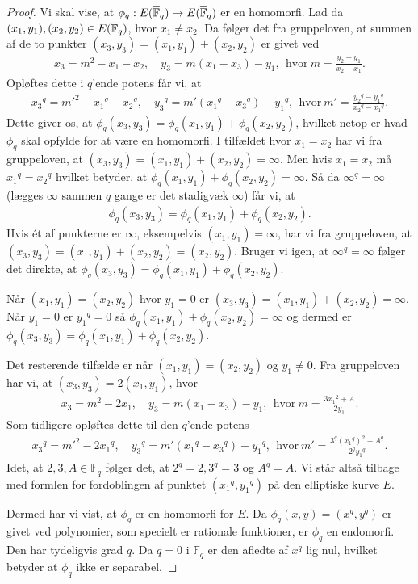 \begin{proof}
Vi skal vise, at $\phi_q : E(\overline{\mathbb{F}}_q) \to E(\overline{\mathbb{F}}_q)$ er en homomorfi. Lad da $(x_1, y_1), (x_2, y_2) \in E(\overline{\mathbb{F}}_q)$, hvor $x_1 \neq x_2$. Da følger det fra gruppeloven, at summen af de to punkter $(x_3, y_3) = (x_1, y_1) + (x_2, y_2)$ er givet ved
\begin{align*}
	x_3 = m^2 - x_1 - x_2, \quad y_3 = m(x_1 - x_3) - y_1, \ \ \text{hvor} \ m=\frac{y_2-y_1}{x_2-x_1}.
\end{align*}
Opløftes dette i $q$'ende potens får vi, at 
\begin{align*}
	{x_3}^q = {m'}^2 - {x_1}^q - {x_2}^q, \quad {y_3}^q = m'({x_1}^q - {x_3}^q) - {y_1}^q, \ \
	\text{hvor} \ m' = \frac{{y_2}^q - {y_1}^q}{{x_2}^q - {x_1}^q}.
\end{align*}
Dette giver os, at $\phi_q(x_3, y_3) = \phi_q(x_1, y_1) + \phi_q(x_2, y_2)$, hvilket netop er hvad $\phi_q$ skal opfylde for at være en homomorfi. I tilfældet hvor $x_1=x_2$ har vi fra gruppeloven, at 
$(x_3, y_3) =(x_1, y_1) + (x_2, y_2) = \infty$. Men hvis $x_1 = x_2$ må ${x_1}^q = {x_2}^q$ hvilket betyder, at $\phi_q(x_1, y_1)+\phi_q(x_2, y_2) = \infty$. Så da $\infty^q = \infty$ (lægges $\infty$ sammen $q$ gange er det stadigvæk $\infty$) får vi, at 
\begin{align*}
	\phi_q(x_3, y_3) = \phi_q(x_1, y_1) + \phi_q(x_2,  y_2).
\end{align*}
Hvis ét af punkterne er $\infty$, eksempelvis $(x_1, y_1)=\infty$, har vi fra gruppeloven, at 
$(x_3, y_3) = (x_1, y_1)+(x_2, y_2) = (x_2, y_2)$. Bruger vi igen, at $\infty^q = \infty$ følger det direkte, at 
$\phi_q(x_3, y_3) = \phi_q(x_1, y_1) + \phi_q(x_2, y_2)$.

Når $(x_1, y_1)=(x_2, y_2)$ hvor $y_1 = 0$ er $(x_3, y_3) = (x_1, y_1)+(x_2, y_2) = \infty$. Når $y_1=0$ er ${y_1}^q=0$ så $\phi_q(x_1, y_1) + \phi_q(x_2, y_2) = \infty$ og dermed er $\phi_q(x_3, y_3) = \phi_q(x_1, y_1) + \phi_q(x_2, y_2)$. 

Det resterende tilfælde er når $(x_1, y_1)=(x_2, y_2)$ og $y_1 \neq 0$. Fra gruppeloven har vi, at 
$(x_3, y_3)= 2(x_1, y_1)$, hvor
\begin{align*}
	x_3 = m^2 - 2x_1, \quad y_3 = m(x_1-x_3)-y_1, \ \ \text{hvor} \ m=\frac{3{x_1}^2+A}{2y_1}.
\end{align*}
Som tidligere opløftes dette til den $q$'ende potens
\begin{align*}
	{x_3}^q = {m'}^2 - 2{x_1}^q, \quad {y_3}^q=m'({x_1}^q-{x_3}^q) - {y_1}^q, \ \ \text{hvor}
	\ m' = \frac{3^q ({x_1}^q)^2 + A^q}{2^q {y_1}^q}.
\end{align*}
Idet, at $2, 3, A \in \mathbb{F}_q$ følger det, at $2^q = 2, 3^q = 3$ og $A^q = A$. Vi står altså tilbage
med formlen for fordoblingen af punktet $({x_1}^q, {y_1}^q)$ på den elliptiske kurve $E$. 

Dermed har vi vist, at $\phi_q$ er en homomorfi for $E$. Da $\phi_q(x, y) = (x^q, y^q)$ er givet ved polynomier, som specielt er rationale funktioner, er $\phi_q$ en endomorfi. Den har tydeligvis grad $q$. Da $q=0$ i $\mathbb{F}_q$ er den afledte af $x^q$ lig nul, hvilket betyder at $\phi_q$ ikke er separabel.
\end{proof}

